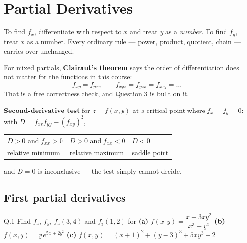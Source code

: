 \chapter{Partial Derivatives}


\begin{keyidea}
To find $f_x$, differentiate with respect to $x$ and treat $y$ as a
\emph{number}. To find $f_y$, treat $x$ as a number. Every ordinary rule ---
power, product, quotient, chain --- carries over unchanged.

\medskip
For mixed partials, \textbf{Clairaut's theorem} says the order of
differentiation does not matter for the functions in this course:
\[
f_{xy}=f_{yx},\qquad f_{xyz}=f_{yzx}=f_{xzy}=\dots
\]
That is a free correctness check, and Question 3 is built on it.

\medskip
\textbf{Second-derivative test} for $z=f(x,y)$ at a critical point where
$f_x=f_y=0$: with $D=f_{xx}f_{yy}-(f_{xy})^{2}$,
\begin{center}
\small\sffamily
\begin{tabular}{@{}L{4.4cm} L{4.4cm} L{4.4cm}@{}}
\toprule
$D>0$ and $f_{xx}>0$ & $D>0$ and $f_{xx}<0$ & $D<0$ \\
relative minimum & relative maximum & saddle point \\
\bottomrule
\end{tabular}
\end{center}
\noindent
and $D=0$ is inconclusive --- the test simply cannot decide.
\end{keyidea}

\section{First partial derivatives}

\begin{question}{Q.1}
Find $f_x$, $f_y$, $f_x(3,4)$ and $f_y(1,2)$ for
\textbf{(a)} $f(x,y)=\dfrac{x+3xy^{2}}{x^{3}+y^{2}}$ \quad
\textbf{(b)} $f(x,y)=y\,e^{5x+2y^{2}}$ \quad
\textbf{(c)} $f(x,y)=(x+1)^{2}+(y-3)^{3}+5xy^{3}-2$
\end{question}

